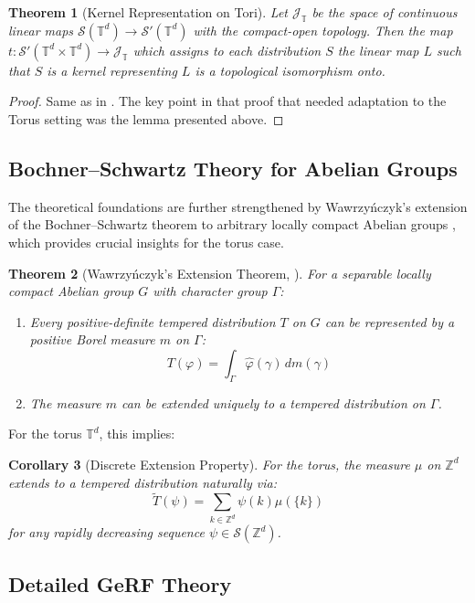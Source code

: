 \documentclass[pdflatex,sn-mathphys,Numbered]{sn-jnl}
\theoremstyle{thmstyleone}%
\newtheorem{theorem}{Theorem}[section]%
\newtheorem{corollary}[theorem]{Corollary}%
\theoremstyle{thmstyletwo}%
\theoremstyle{thmstylethree}%
\newcommand{\ZZ}{\mathbb{Z}}
\newcommand{\TT}{\mathbb{T}}
\newcommand{\calS}{\mathcal{S}}
\begin{document}
\begin{appendices}
\begin{theorem}[Kernel Representation on Tori] \label{kernel}
Let $\mathscr{J}_{\TT}$ be the space of continuous linear maps $\calS(\TT^d) \to \calS'(\TT^d)$ with the compact-open topology. Then the map $t: \calS'(\TT^d \times \TT^d) \to \mathscr{J}_{\TT}$ which assigns to each distribution $S$ the linear map $L$ such that $S$ is a kernel representing $L$ is a topological isomorphism onto.
\end{theorem}

\begin{proof}
    Same as in \cite{ehrenpreis}. The key point in that proof that needed adaptation to the Torus setting
    was the lemma presented above.
\end{proof}

\subsection{Bochner--Schwartz Theory for Abelian Groups}

The theoretical foundations are further strengthened by Wawrzy\'nczyk's extension of the Bochner--Schwartz theorem to arbitrary locally compact Abelian groups \cite{wawrzynczyk}, which provides crucial insights for the torus case.

\begin{theorem}[Wawrzy\'nczyk's Extension Theorem, \cite{wawrzynczyk}] \label{abelian}
For a separable locally compact Abelian group $G$ with character group $\Gamma$:
\begin{enumerate}
\item Every positive-definite tempered distribution $T$ on $G$ can be represented by a positive Borel measure $m$ on $\Gamma$:
$$T(\varphi) = \int_\Gamma \hat{\varphi}(\gamma) \, dm(\gamma)$$
\item The measure $m$ can be extended uniquely to a tempered distribution on $\Gamma$.
\end{enumerate}
\end{theorem}

For the torus $\TT^d$, this implies:

\begin{corollary}[Discrete Extension Property]
For the torus, the measure $\mu$ on $\ZZ^d$ extends to a tempered distribution naturally via:
$$\tilde{T}(\psi) = \sum_{k \in \ZZ^d} \psi(k) \mu(\{k\})$$
for any rapidly decreasing sequence $\psi \in \calS(\ZZ^d)$.
\end{corollary}

\subsection{Detailed GeRF Theory}
\label{subsec:gerf-theory}


\end{appendices}
\end{document}
